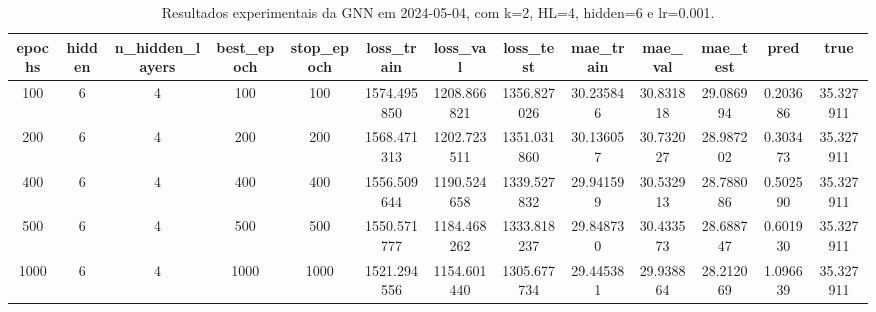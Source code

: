 \begin{table}[h]
\centering
\caption{Resultados experimentais da GNN em 2024-05-04, com k=2, HL=4, hidden=6 e lr=0.001.}
\label{tab:gnn_results_k2_hl4_h6_d20240504}
\begin{tabular}{ccccccccccccc}
\toprule
epochs & hidden & n\_hidden\_layers & best\_epoch & stop\_epoch & loss\_train & loss\_val & loss\_test & mae\_train & mae\_val & mae\_test & pred & true \\
\midrule
100 & 6 & 4 & 100 & 100 & 1574.495850 & 1208.866821 & 1356.827026 & 30.235846 & 30.831818 & 29.086994 & 0.203686 & 35.327911 \\
200 & 6 & 4 & 200 & 200 & 1568.471313 & 1202.723511 & 1351.031860 & 30.136057 & 30.732027 & 28.987202 & 0.303473 & 35.327911 \\
400 & 6 & 4 & 400 & 400 & 1556.509644 & 1190.524658 & 1339.527832 & 29.941599 & 30.532913 & 28.788086 & 0.502590 & 35.327911 \\
500 & 6 & 4 & 500 & 500 & 1550.571777 & 1184.468262 & 1333.818237 & 29.848730 & 30.433573 & 28.688747 & 0.601930 & 35.327911 \\
1000 & 6 & 4 & 1000 & 1000 & 1521.294556 & 1154.601440 & 1305.677734 & 29.445381 & 29.938864 & 28.212069 & 1.096639 & 35.327911 \\
\bottomrule
\end{tabular}
\end{table}
